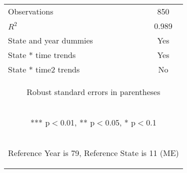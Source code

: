 \begin{center}
\begin{tabular}{lc}
Observations & 850 \\
$R^2$ & 0.989 \\
State and year dummies & Yes \\
State * time trends & Yes \\
 State * time2 trends & No \\ \hline
\multicolumn{2}{c}{\begin{footnotesize} Robust standard errors in parentheses\end{footnotesize}} \\
\multicolumn{2}{c}{\begin{footnotesize} *** p$<$0.01, ** p$<$0.05, * p$<$0.1\end{footnotesize}} \\
\multicolumn{2}{c}{\begin{footnotesize} Reference Year is 79, Reference State is 11 (ME)\end{footnotesize}} \\
\end{tabular}
\end{center}
